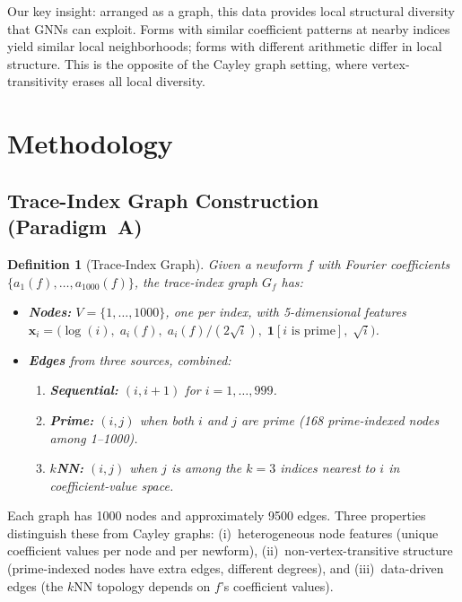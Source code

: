 \documentclass[11pt]{article}
\newtheorem{definition}{Definition}
\begin{document}
Our key insight: arranged as a graph, this data provides local structural diversity that GNNs can exploit. Forms with similar coefficient patterns at nearby indices yield similar local neighborhoods; forms with different arithmetic differ in local structure. This is the opposite of the Cayley graph setting, where vertex-transitivity erases all local diversity.

\section{Methodology}
\label{sec:methodology}

\subsection{Trace-Index Graph Construction (Paradigm~A)}

\begin{definition}[Trace-Index Graph]
Given a newform $f$ with Fourier coefficients $\{a_1(f), \ldots, a_{1000}(f)\}$, the trace-index graph $G_f$ has:
\begin{itemize}
  \item \textbf{Nodes:} $V = \{1, \ldots, 1000\}$, one per index, with 5-dimensional features $\mathbf{x}_i = \bigl(\log(i),\; a_i(f),\; a_i(f)/(2\sqrt{i}),\; \mathbf{1}[\text{$i$ is prime}],\; \sqrt{i}\bigr)$.
  \item \textbf{Edges} from three sources, combined:
    \begin{enumerate}
      \item \textbf{Sequential:} $(i, i+1)$ for $i = 1, \ldots, 999$.
      \item \textbf{Prime:} $(i, j)$ when both $i$ and $j$ are prime (168 prime-indexed nodes among 1--1000).
      \item \textbf{$k$NN:} $(i, j)$ when $j$ is among the $k{=}3$ indices nearest to $i$ in coefficient-value space.
    \end{enumerate}
\end{itemize}
\end{definition}

Each graph has 1000 nodes and approximately 9500 edges. Three properties distinguish these from Cayley graphs: (i)~heterogeneous node features (unique coefficient values per node and per newform), (ii)~non-vertex-transitive structure (prime-indexed nodes have extra edges, different degrees), and (iii)~data-driven edges (the $k$NN topology depends on $f$'s coefficient values).
\end{document}
